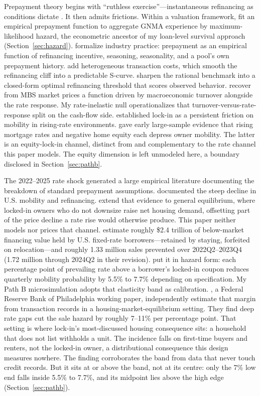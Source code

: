 \documentclass[12pt]{article}
\begin{document}
Prepayment theory begins with ``ruthless exercise''---instantaneous refinancing as conditions dictate \citep{dunn1981}. It then admits frictions. Within a valuation framework, \citet{schwartz1989} fit an empirical prepayment function to aggregate GNMA experience by maximum-likelihood hazard, the econometric ancestor of my loan-level survival approach (Section~\ref{sec:hazard}). \citet{richard1989} formalize industry practice: prepayment as an empirical function of refinancing incentive, seasoning, seasonality, and a pool's own prepayment history. \citet{stanton1995} add heterogeneous transaction costs, which smooth the refinancing cliff into a predictable S-curve. \citet{agarwal2013} sharpen the rational benchmark into a closed-form optimal refinancing threshold that scores observed behavior. \citet{chernov2018} recover from MBS market prices a function driven by macroeconomic turnover alongside the rate response. My rate-inelastic null operationalizes that turnover-versus-rate-response split on the cash-flow side. \citet{quigley1987,quigley2002} established lock-in as a persistent friction on mobility in rising-rate environments. \citet{ferreira2010} gave early large-sample evidence that rising mortgage rates and negative home equity each depress owner mobility. The latter is an equity-lock-in channel, distinct from and complementary to the rate channel this paper models. The equity dimension is left unmodeled here, a boundary disclosed in Section~\ref{sec:pathb}.

The 2022--2025 rate shock generated a large empirical literature documenting the breakdown of standard prepayment assumptions. \citet{fonseca2024} documented the steep decline in U.S. mobility and refinancing. \citet{fonseca2026} extend that evidence to general equilibrium, where locked-in owners who do not downsize raise net housing demand, offsetting part of the price decline a rate rise would otherwise produce. This paper neither models nor prices that channel. \citet{batzer2024} estimate roughly \$2.4 trillion of below-market financing value held by U.S. fixed-rate borrowers---retained by staying, forfeited on relocation---and roughly 1.33 million sales prevented over 2022Q2--2023Q4 (1.72 million through 2024Q2 in their revision). \citet{liebersohn2024} put it in hazard form: each percentage point of prevailing rate above a borrower's locked-in coupon reduces quarterly mobility probability by 5.5\% to 7.7\% depending on specification. My Path B microsimulation adopts that elasticity band as calibration. \citet{graybill2026}, a Federal Reserve Bank of Philadelphia working paper, independently estimate that margin from transaction records in a housing-market-equilibrium setting. They find deep rate gaps cut the sale hazard by roughly 7--11\% per percentage point. That setting is where lock-in's most-discussed housing consequence sits: a household that does not list withholds a unit. The incidence falls on first-time buyers and renters, not the locked-in owner, a distributional consequence this design measures nowhere. The finding corroborates the band from data that never touch credit records. But it sits at or above the band, not at its centre: only the 7\% low end falls inside 5.5\% to 7.7\%, and its midpoint lies above the high edge (Section~\ref{sec:pathb}).
\end{document}

